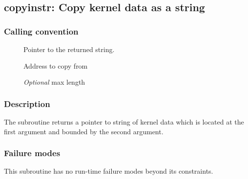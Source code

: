 \clearpage
{}
{}
\label{subr:copyinstr}
\subsection*{copyinstr: Copy kernel data as a string}

\subsubsection*{Calling convention}

\begin{description}
\item[] Pointer to the returned string.
\item[] Address to copy from
\item[] \emph{Optional} max length  
\end{description}

\subsubsection*{Description}

The  subroutine returns a pointer to string of
kernel data which is located at the first argument and bounded by the
second argument.

\subsubsection*{Failure modes}

This subroutine has no run-time failure modes beyond its constraints.
